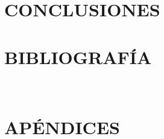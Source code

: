 \documentclass[10pt]{article}
\begin{document}


\blindmathpaper %


\newpage
\setcounter{equation}{0} %
\setcounter{figure}{0} %
\setcounter{table}{0} %
\section{CONCLUSIONES}



\blindmathpaper %


\newpage
\setcounter{equation}{0} %
\setcounter{figure}{0} %
\setcounter{table}{0} %
\section{BIBLIOGRAFÍA}
 
 
\

\newpage
\pagestyle{empty} %
\setcounter{equation}{0} %
\setcounter{figure}{0} %
\setcounter{table}{0} %
\renewcommand{\thesubsection}{APÉNDICE \Alph{subsection}:}                            %
\renewcommand{\thesubsubsection}{\Alph{subsection}.\arabic{subsubsection}:}       %
\renewcommand{\theequation}{.\Alph{subsection}\arabic{equation}} %
\renewcommand{\thefigure}{\Alph{subsection}.\arabic{figure}} %
\renewcommand{\thetable}{\Alph{subsection}.\arabic{table}} %

\section*{APÉNDICES}


\end{document}
